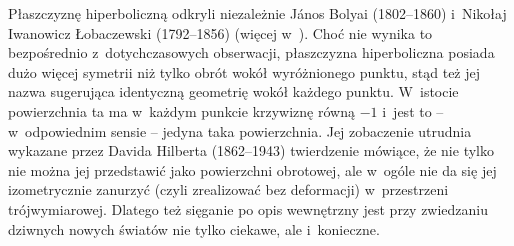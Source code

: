 Płaszczyznę hiperboliczną odkryli niezależnie J{\'a}nos Bolyai (1802--1860) i~Nikołaj Iwanowicz Łobaczewski (1792--1856) (więcej w~). Choć nie wynika to bezpośrednio z~dotychczasowych obserwacji, płaszczyzna hiperboliczna posiada dużo więcej symetrii niż tylko obrót wokół wyróżnionego punktu, stąd też jej nazwa sugerująca identyczną geometrię wokół każdego punktu. W~istocie powierzchnia ta ma w~każdym punkcie krzywiznę równą $-1$ 
i~jest to -- w~odpowiednim sensie -- jedyna taka powierzchnia. Jej zobaczenie utrudnia wykazane przez Davida Hilberta (1862--1943) twierdzenie mówiące, że nie tylko nie można jej przedstawić jako powierzchni obrotowej, ale w~ogóle nie da się jej izometrycznie zanurzyć (czyli zrealizować bez deformacji) w~przestrzeni trójwymiarowej. Dlatego też sięganie po opis wewnętrzny jest przy zwiedzaniu dziwnych nowych światów nie tylko ciekawe, ale i~konieczne.\goodbreak

\normalsize